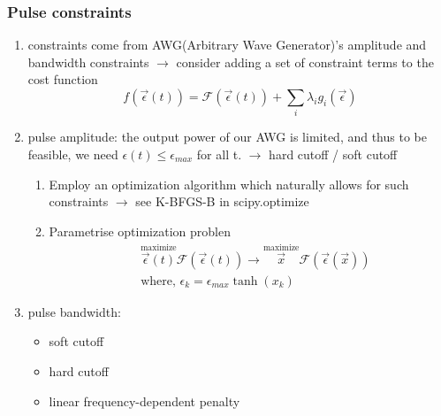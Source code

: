 \documentclass{article}
\begin{document}
\subsubsection{Pulse constraints}
\begin{enumerate}
    \item constraints come from AWG(Arbitrary Wave Generator)'s amplitude and bandwidth constraints
        $\rightarrow$ consider adding a set of constraint terms to the cost function
        \begin{equation*}
            f(\vec{\epsilon}(t)) = \mathcal{F}(\vec{\epsilon}(t)) + \sum_i \lambda_i g_i(\vec{\epsilon})
        \end{equation*}
    \item pulse amplitude: the output power of our AWG is limited, and thus to be feasible, we need $\epsilon(t) ≤ \epsilon_{max}$ for all t. $\rightarrow$ hard cutoff / soft cutoff
        \begin{enumerate}
            \item Employ an optimization algorithm which naturally allows for such constraints $\rightarrow$ see K-BFGS-B in scipy.optimize
            \item Parametrise optimization problen 
                \begin{align*}
                    &\stackrel{\text{maximize}}{\vec{\epsilon}(t)}  \mathcal{F} (\vec{\epsilon}(t)) 
                    \rightarrow \stackrel{\text{maximize}}{\vec{x}}  \mathcal{F} (\vec{\epsilon}(\vec{x})) \\
                    &\text{where, } \epsilon_k = \epsilon_{max} \tanh{(x_k)} 
                \end{align*}
        \end{enumerate}
    \item pulse bandwidth:   
        \begin{itemize}
            \item soft cutoff
            \item hard cutoff
            \item linear frequency-dependent penalty
        \end{itemize}
\end{enumerate}
\end{document}
